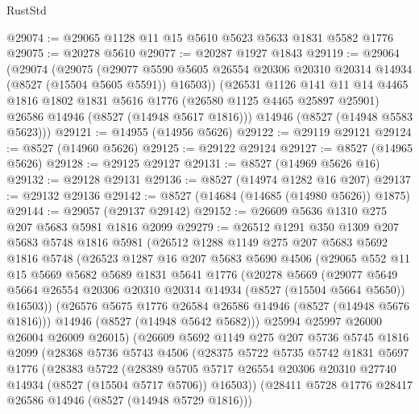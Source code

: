 \begin{lexlean}{RustStd}
\begin{coremodule}
@29074 := @29065 @1128 @11 @15 @5610 @5623 @5633 @1831 @5582 @1776
@29075 := @20278 @5610
@29077 := @20287 @1927 @1843
@29119 := @29064
    (@29074
      (@29075
        (@29077 @5590 @5605 @26554 @20306 @20310 @20314 @14934 (@8527 (@15504 @5605 @5591)) @16503))
      (@26531
        @1126
        @141
        @11
        @14
        @4465
        @1816
        @1802
        @1831
        @5616
        @1776
        (@26580 @1125 @4465 @25897 @25901)
        @26586
        @14946
        (@8527 (@14948 @5617 @1816)))
      @14946
      (@8527 (@14948 @5583 @5623)))
@29121 := @14955 (@14956 @5626)
@29122 := @29119 @29121
@29124 := @8527 (@14960 @5626)
@29125 := @29122 @29124
@29127 := @8527 (@14965 @5626)
@29128 := @29125 @29127
@29131 := @8527 (@14969 @5626 @16)
@29132 := @29128 @29131
@29136 := @8527 (@14974 @1282 @16 @207)
@29137 := @29132 @29136
@29142 := @8527 (@14684 (@14685 (@14980 @5626)) @1875)
@29144 := @29057 (@29137 @29142)
@29152 := @26609 @5636 @1310 @275 @207 @5683 @5981 @1816 @2099
@29279 := @26512
    @1291
    @350
    @1309
    @207
    @5683
    @5748
    @1816
    @5981
    (@26512
      @1288
      @1149
      @275
      @207
      @5683
      @5692
      @1816
      @5748
      (@26523
        @1287
        @16
        @207
        @5683
        @5690
        @4506
        (@29065
          @552
          @11
          @15
          @5669
          @5682
          @5689
          @1831
          @5641
          @1776
          (@20278
            @5669
            (@29077
              @5649
              @5664
              @26554
              @20306
              @20310
              @20314
              @14934
              (@8527 (@15504 @5664 @5650))
              @16503))
          (@26576 @5675 @1776 @26584 @26586 @14946 (@8527 (@14948 @5676 @1816)))
          @14946
          (@8527 (@14948 @5642 @5682)))
        @25994
        @25997
        @26000
        @26004
        @26009
        @26015)
      (@26609
        @5692
        @1149
        @275
        @207
        @5736
        @5745
        @1816
        @2099
        (@28368
          @5736
          @5743
          @4506
          (@28375
            @5722
            @5735
            @5742
            @1831
            @5697
            @1776
            (@28383
              @5722
              (@28389
                @5705
                @5717
                @26554
                @20306
                @20310
                @27740
                @14934
                (@8527 (@15504 @5717 @5706))
                @16503))
            (@28411 @5728 @1776 @28417 @26586 @14946 (@8527 (@14948 @5729 @1816)))

\end{coremodule}
\end{lexlean}
